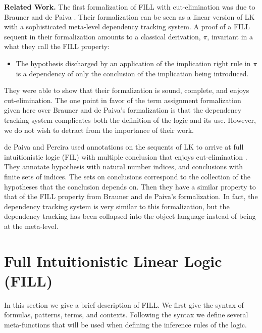 \textbf{Related Work.} The first formalization of FILL with
cut-elimination was due to Brauner and de Paiva \cite{Brauner:1998}.
Their formalization can be seen as a linear version of LK with a
sophisticated meta-level dependency tracking system.  A proof of a
FILL sequent in their formalization amounts to a classical derivation,
$\pi$, invariant in a what they call the FILL property:
\begin{center}
  \begin{itemize}
  \item The hypothesis discharged by an application of the implication
    right rule in $\pi$ is a dependency of only the conclusion of the
    implication being introduced.
  \end{itemize}
\end{center}
They were able to show that their formalization is sound, complete,
and enjoys cut-elimination.  The one point in favor of the term
assignment formalization given here over Brauner and de Paiva's
formalization is that the dependency tracking system complicates both
the definition of the logic and its use.  However, we do not wish to
detract from the importance of their work.

de Paiva and Pereira used annotations on the sequents of LK to arrive
at full intuitionistic logic (FIL) with multiple conclusion that
enjoys cut-elimination \cite{dePaiva:2005}. They annotate hypothesis
with natural number indices, and conclusions with finite sets of
indices.  The sets on conclusions correspond to the collection of the
hypotheses that the conclusion depends on.  Then they have a similar
property to that of the FILL property from Brauner and de Paiva's
formalization.  In fact, the dependency tracking system is very
similar to this formalization, but the dependency tracking has been
collapsed into the object language instead of being at the meta-level.

\section{Full Intuitionistic Linear Logic (FILL)}
\label{sec:full_intuitionistic_linear_logic_(fill)}

In this section we give a brief description of FILL.  We first give
the syntax of formulas, patterns, terms, and contexts.  Following the
syntax we define several meta-functions that will be used when
defining the inference rules of the logic.

